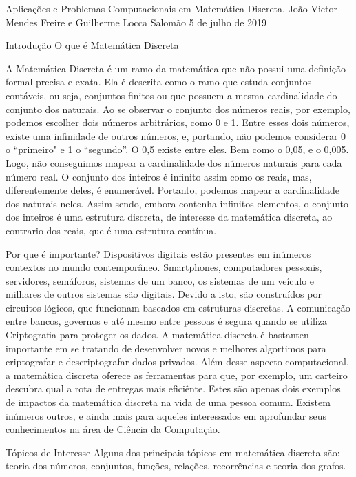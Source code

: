 Aplicações e Problemas Computacionais em Matemática Discreta.
João Victor Mendes Freire e Guilherme Locca Salomão
5 de julho de 2019

Introdução
    O que é Matemática Discreta

        A Matemática Discreta é um ramo da matemática que não possui uma definição formal precisa e exata. Ela é descrita como o ramo que estuda conjuntos contáveis, ou seja, conjuntos finitos ou que possuem a mesma cardinalidade do conjunto dos naturais.
        Ao se observar o conjunto dos números reais, por exemplo, podemos escolher dois números arbitrários, como 0 e 1. Entre esses dois números, existe uma infinidade de outros números, e, portando, não podemos considerar 0 o “primeiro" e 1 o “segundo”. O 0,5 existe entre eles. Bem como o 0,05, e o 0,005. Logo, não conseguimos mapear a cardinalidade dos números naturais para cada número real.
        O conjunto dos inteiros é infinito assim como os reais, mas, diferentemente deles, é enumerável. Portanto, podemos mapear a cardinalidade dos naturais neles. 
        Assim sendo, embora contenha infinitos elementos, o conjunto dos inteiros é uma estrutura discreta, de interesse da matemática discreta, ao contrario dos reais, que é uma estrutura contínua.


    Por que é importante?
        Dispositivos digitais estão presentes em inúmeros contextos no mundo contemporâneo. Smartphones, computadores pessoais, servidores, semáforos, sistemas de um banco, os sistemas de um veículo e milhares de outros sistemas são digitais. Devido a isto, são construídos por circuitos lógicos, que funcionam baseados em estruturas discretas.
        A comunicação entre bancos, governos e até mesmo entre pessoas é segura quando se utiliza Criptografia para proteger os dados. A matemática discreta é bastanten importante em se tratando de desenvolver novos e melhores algortimos para criptografar e descriptografar dados privados.
        Além desse aspecto computacional, a matemática discreta oferece as ferramentas para que, por exemplo, um carteiro descubra qual a rota de entregas mais eficiênte.
        Estes são apenas dois exemplos de impactos da matemática discreta na vida de uma pessoa comum. Existem inúmeros outros, e ainda mais para aqueles interessados em aprofundar seus conhecimentos na área de Ciência da Computação.


    Tópicos de Interesse
        Alguns dos principais tópicos em matemática discreta são: teoria dos números, conjuntos, funções, relações, recorrências e teoria dos grafos.

